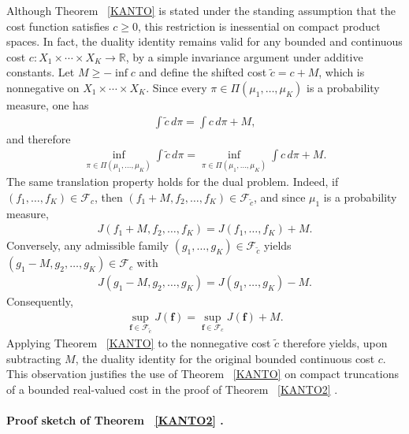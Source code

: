 \documentclass[twoside,11pt,a4paper]{article}
\newcommand*{\SavedRef}{}
\let\SavedRef\ref
\renewcommand*{\ref}[1]{  \begingroup
    \hypersetup{
      linkcolor=linkequation,
      linkbordercolor=linkequation,
    }    \SavedRef{#1}  \endgroup
}
\begin{document}
\begin{remark}
\item 
Although Theorem~\ref{KANTO} is stated under the standing assumption that the cost
function satisfies \(c\ge 0\), this restriction is inessential on compact product
spaces. In fact, the duality identity remains valid for any bounded and continuous
cost \(c: X_1\times\cdots\times X_K\to\mathbb{R}\), by a simple invariance argument
under additive constants. 
Let \(M\ge -\inf c\) and define the shifted cost \(\widetilde c = c+M\), which is
nonnegative on \(X_1\times\cdots\times X_K\). Since every
\(\pi\in\Pi(\mu_1,\ldots,\mu_K)\) is a probability measure, one has
\begin{align*}
\int \widetilde c\,d\pi
=
\int c\,d\pi + M,
\end{align*}
and therefore
\begin{align*}
\inf_{\pi\in\Pi(\mu_1,\ldots,\mu_K)} \int \widetilde c\,d\pi
=
\inf_{\pi\in\Pi(\mu_1,\ldots,\mu_K)} \int c\,d\pi + M.
\end{align*}
The same translation property holds for the dual problem. Indeed, if
\((f_1,\ldots,f_K)\in\mathcal{F}_c\), then
\((f_1+M,f_2,\ldots,f_K)\in\mathcal{F}_{\widetilde c}\), and since \(\mu_1\) is a
probability measure,
\begin{align*}
J(f_1+M,f_2,\ldots,f_K)
=
J(f_1,\ldots,f_K)+M.
\end{align*}
Conversely, any admissible family
\((g_1,\ldots,g_K)\in\mathcal{F}_{\widetilde c}\) yields
\((g_1-M,g_2,\ldots,g_K)\in\mathcal{F}_c\) with
\begin{align*}
J(g_1-M,g_2,\ldots,g_K)
=
J(g_1,\ldots,g_K)-M.
\end{align*}
Consequently,
\begin{align*}
\sup_{\boldsymbol f\in\mathcal{F}_{\widetilde c}} J(\boldsymbol f)
=
\sup_{\boldsymbol f\in\mathcal{F}_c} J(\boldsymbol f)+M.
\end{align*}
Applying Theorem~\ref{KANTO} to the nonnegative cost \(\widetilde c\) therefore yields,
upon subtracting \(M\), the duality identity for the original bounded continuous cost
\(c\). 
This observation justifies the use of Theorem~\ref{KANTO} on compact truncations of a bounded real-valued cost in the proof of Theorem~\ref{KANTO2}.
\end{remark}









\paragraph{Proof sketch of Theorem~\ref{KANTO2}.}
\end{document}
